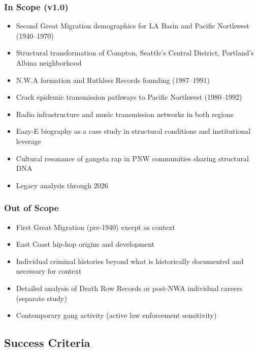 \documentclass[11pt,letterpaper]{article}
\begin{document}
\subsubsection{In Scope (v1.0)}

\begin{itemize}[leftmargin=1.5em]
  \item Second Great Migration demographics for LA Basin and Pacific Northwest (1940--1970)
  \item Structural transformation of Compton, Seattle's Central District, Portland's Albina neighborhood
  \item N.W.A formation and Ruthless Records founding (1987--1991)
  \item Crack epidemic transmission pathways to Pacific Northwest (1980--1992)
  \item Radio infrastructure and music transmission networks in both regions
  \item Eazy-E biography as a case study in structural conditions and institutional leverage
  \item Cultural resonance of gangsta rap in PNW communities sharing structural DNA
  \item Legacy analysis through 2026
\end{itemize}

\subsubsection{Out of Scope}

\begin{itemize}[leftmargin=1.5em]
  \item First Great Migration (pre-1940) except as context
  \item East Coast hip-hop origins and development
  \item Individual criminal histories beyond what is historically documented and necessary for context
  \item Detailed analysis of Death Row Records or post-NWA individual careers (separate study)
  \item Contemporary gang activity (active law enforcement sensitivity)
\end{itemize}

\subsection{Success Criteria}
\end{document}
